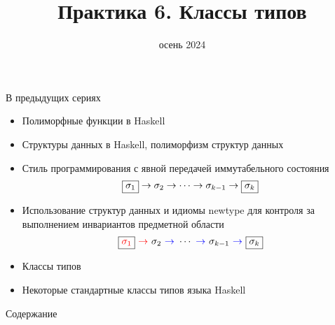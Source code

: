 
\newif\ifhandout




\title[6. Классы типов]{Практика 6. Классы типов}
\date{осень 2024}



    \setcounter{framenumber}{-1}
    \maketitle

    \begin{frame}[fragile]{В предыдущих сериях}
        \begin{itemize}
            \item Полиморфные функции в Haskell
            \item Структуры данных в Haskell, полиморфизм структур данных
            \item[\NB] Стиль программирования с явной передачей иммутабельного состояния
            \begin{equation*}
                \framebox{$\sigma_1$} \to \sigma_2 \to \cdots \to \sigma_{k - 1} \to \framebox{$\sigma_k$}
            \end{equation*}
            \item[\NB] Использование структур данных и идиомы newtype для контроля за выполнением инвариантов предметной области
            \begin{equation*}
                \framebox{\color{red}$\sigma_1$} {~\color{red} \rightarrow~} \sigma_2 {~\color{blue} \to~} \cdots {~\color{blue} \to~} \sigma_{k - 1} {~\color{blue} \to~} \framebox{$\sigma_k$}
            \end{equation*}
            \item[\newtopic] Классы типов
            \item[\newtopic] Некоторые стандартные классы типов языка Haskell
        \end{itemize}
    \end{frame}

    \begin{frame}[noframenumbering]{Содержание}
        \tableofcontents
    \end{frame}


